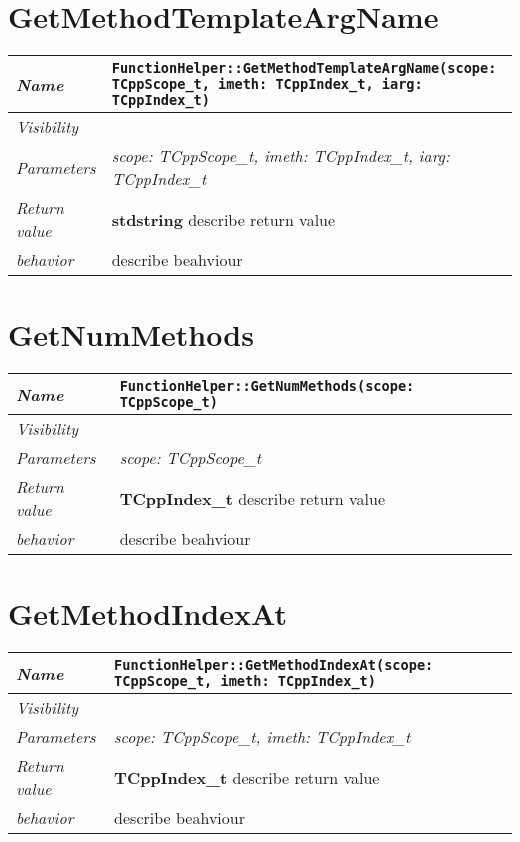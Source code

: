  \section{GetMethodTemplateArgName}
\begin{longtable}{p{3cm} @{\hskip 1cm} p{12cm}}
 \hline
\textit{Name} & \texttt{FunctionHelper::GetMethodTemplateArgName(scope: TCppScope_t, imeth: TCppIndex_t, iarg: TCppIndex_t)}\\
\hline
 \textit{Visibility} & \\
\hline
\textit{Parameters} & \textit{scope: TCppScope_t, imeth: TCppIndex_t, iarg: TCppIndex_t}\\
\hline
\textit{Return value} & \textbf{ stdstring} describe return value\\
  \hline
 \textit{behavior} & describe beahviour \\
\hline
\end{longtable} \pagebreak
 \section{GetNumMethods}
\begin{longtable}{p{3cm} @{\hskip 1cm} p{12cm}}
 \hline
\textit{Name} & \texttt{FunctionHelper::GetNumMethods(scope: TCppScope_t)}\\
\hline
 \textit{Visibility} & \\
\hline
\textit{Parameters} & \textit{scope: TCppScope_t}\\
\hline
\textit{Return value} & \textbf{ TCppIndex_t} describe return value\\
  \hline
 \textit{behavior} & describe beahviour \\
\hline
\end{longtable} \pagebreak
 \section{GetMethodIndexAt}
\begin{longtable}{p{3cm} @{\hskip 1cm} p{12cm}}
 \hline
\textit{Name} & \texttt{FunctionHelper::GetMethodIndexAt(scope: TCppScope_t, imeth: TCppIndex_t)}\\
\hline
 \textit{Visibility} & \\
\hline
\textit{Parameters} & \textit{scope: TCppScope_t, imeth: TCppIndex_t}\\
\hline
\textit{Return value} & \textbf{ TCppIndex_t} describe return value\\
  \hline
 \textit{behavior} & describe beahviour \\
\hline
\end{longtable} \pagebreak
